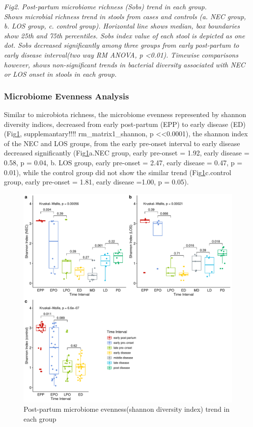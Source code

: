 \documentclass[fleqn,10pt]{wlpeerj} %
\begin{document}
      \textit{Fig2. Post-partum microbiome richness (Sobs) trend in each group. \\ Shows microbial richness trend in stools from cases and controls (a. NEC group, b. LOS group, c. control group). Horizontal line shows median, box boundaries show 25th and 75th percentiles. Sobs index value of each stool is depicted as one dot. Sobs decreased significantly among three groups from early post-partum to early disease interval(two way RM ANOVA, p <0.01). Timewise comparisons however, shows non-significant trends in bacterial diversity associated with NEC or LOS onset in stools in each group. }

    \subsubsection*{Microbiome Evenness Analysis}
    Similar to microbiota richness, the microbiome evenness represented by shannon diversity indices, decreased from early post-partum (EPP) to early disease (ED)(Fig\ref{fig:shannon-group-time}, supplemantary!!!! rm\_matrix1\_shannon, p \textless <0.0001), the shannon index of the NEC and LOS groups, from the early pre-onset interval to early disease decreased significantly (Fig\ref{fig:shannon-group-time}a.NEC group, early pre-onset = 1.92, early disease = 0.58, p = 0.04, b. LOS group, early pre-onset = 2.47, early disease = 0.47, p = 0.01), while the control group did not show the similar trend (Fig\ref{fig:shannon-group-time}c.control group, early pre-onset = 1.81, early disease =1.00, p = 0.05).
    \begin{figure}[ht]\centering
      \includegraphics[width=\linewidth]{figure/shannon-group-time.pdf}
      \caption{Post-partum microbiome evenness(shannon diversity index) trend in each group}
      \label{fig:shannon-group-time}
    \end{figure}
\end{document}
